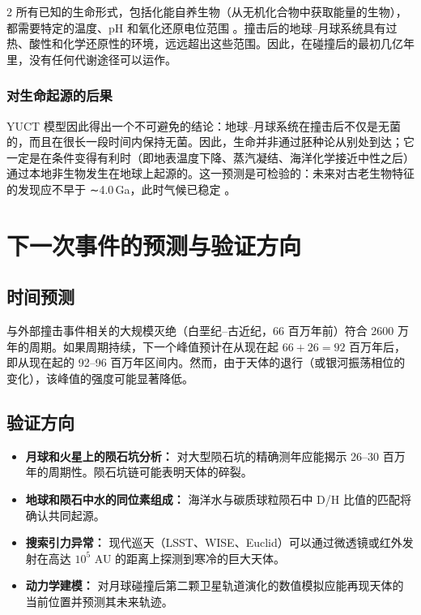 \documentclass[11pt,a4paper]{article}
\begin{document}
\begin{multicols}{2}
		所有已知的生命形式，包括化能自养生物（从无机化合物中获取能量的生物），都需要特定的温度、pH 和氧化还原电位范围 \cite{Chemolithoautotroph}。撞击后的地球–月球系统具有过热、酸性和化学还原性的环境，远远超出这些范围。因此，在碰撞后的最初几亿年里，没有任何代谢途径可以运作。
		
		\subsubsection{对生命起源的后果}
		
		YUCT 模型因此得出一个不可避免的结论：地球–月球系统在撞击后不仅是无菌的，而且在很长一段时间内保持无菌。因此，生命并非通过胚种论从别处到达；它一定是在条件变得有利时（即地表温度下降、蒸汽凝结、海洋化学接近中性之后）通过本地非生物发生在地球上起源的。这一预测是可检验的：未来对古老生物特征的发现应不早于 ∼4.0 Ga，此时气候已稳定 \cite{AbiogenesisReview}。
		
		\section{下一次事件的预测与验证方向}
		
		\subsection{时间预测}
		
		与外部撞击事件相关的大规模灭绝（白垩纪–古近纪，66 百万年前）符合 2600 万年的周期。如果周期持续，下一个峰值预计在从现在起 \(66 + 26 = 92\) 百万年后，即从现在起的 92–96 百万年区间内。然而，由于天体的退行（或银河振荡相位的变化），该峰值的强度可能显著降低。
		
		\subsection{验证方向}
		
		\begin{itemize}
			\item \textbf{月球和火星上的陨石坑分析：} 对大型陨石坑的精确测年应能揭示 26–30 百万年的周期性。陨石坑链可能表明天体的碎裂。
			\item \textbf{地球和陨石中水的同位素组成：} 海洋水与碳质球粒陨石中 D/H 比值的匹配将确认共同起源。
			\item \textbf{搜索引力异常：} 现代巡天（LSST、WISE、Euclid）可以通过微透镜或红外发射在高达 \(10^5\) AU 的距离上探测到寒冷的巨大天体。
			\item \textbf{动力学建模：} 对月球碰撞后第二颗卫星轨道演化的数值模拟应能再现天体的当前位置并预测其未来轨迹。
		\end{itemize}
		

\end{multicols}
\end{document}
